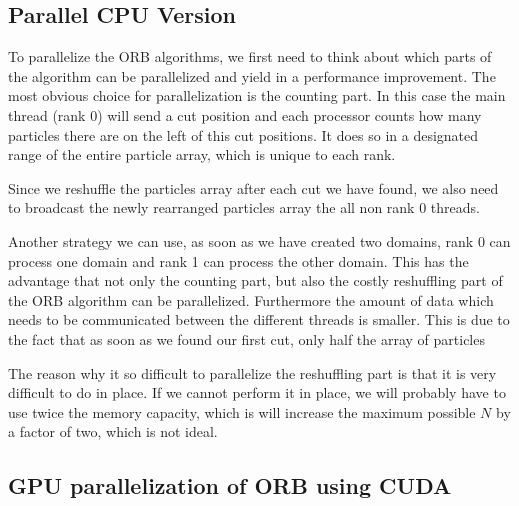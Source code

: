 \documentclass[]{article}
\begin{document}
\subsection{Parallel CPU Version}

To parallelize the ORB algorithms, we first need to think about which parts of the algorithm can be parallelized and yield in a performance improvement. The most obvious choice for parallelization is the counting part. In this case the main thread (rank 0) will send a cut position and each processor counts how many particles there are on the left of this cut positions. It does so in a designated range of the entire particle array, which is unique to each rank.

Since we reshuffle the particles array after each cut we have found, we also need to broadcast the newly rearranged particles array the all non rank 0 threads.

Another strategy we can use, as soon as we have created two domains, rank 0 can process one domain and rank 1 can process the other domain. This has the advantage that not only the counting part, but also the costly reshuffling part of the ORB algorithm can be parallelized. Furthermore the amount of data which needs to be communicated between the different threads is smaller. This is due to the fact that as soon as we found our first cut, only half the array of particles 

\vspace{5mm}

The reason why it so difficult to parallelize the reshuffling part is that it is very difficult to do in place. If we cannot perform it in place, we will probably have to use twice the memory capacity, which is will increase the maximum possible $N$ by a factor of two, which is not ideal.


\subsection{GPU parallelization of ORB using CUDA }



\end{document}
